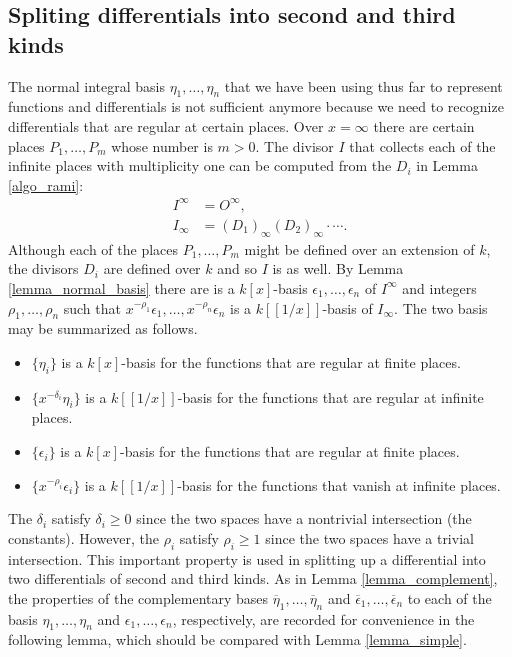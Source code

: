 \documentclass[12pt,reqno]{amsart}
\numberwithin{equation}{section}
\begin{document}
\subsection{Spliting differentials into second and third kinds}
\label{subsection_split23}
The normal integral basis $\eta_1,\dots,\eta_n$ that we have been using thus far to represent functions and differentials is not sufficient anymore because we need to recognize differentials that are regular at certain places. Over $x=\infty$ there are certain places $P_1,\dots,P_m$ whose number is $m>0$. The divisor $I$ that collects each of the infinite places with multiplicity one can be computed from the $D_i$ in Lemma \ref{algo_rami}:
\begin{align*}
 I^{\infty} &= O^{\infty}\text{,}\\
 I_{\infty} &= (D_1)_{\infty}(D_2)_{\infty} \cdot \cdots\text{.}
\end{align*}
Although each of the places $P_1,\dots,P_{m}$ might be defined over an extension of $k$, the divisors $D_i$ are defined over $k$ and so $I$ is as well. By Lemma \ref{lemma_normal_basis} there are is a $k[x]$-basis $\epsilon_1,\dots,\epsilon_n$ of $I^{\infty}$ and integers $\rho_1,\dots,\rho_n$ such that $x^{-\rho_1}\epsilon_1,\dots,x^{-\rho_n}\epsilon_n$ is a $k[[1/x]]$-basis of $I_{\infty}$. The two basis may be summarized as follows.
\begin{itemize}
 \item $\{\eta_i\}$ is a $k[x]$-basis for the functions that are regular at finite places.
 \item $\{x^{-\delta_i} \eta_i\}$ is a $k[[1/x]]$-basis for the functions that are regular at infinite places.
 \item $\{\epsilon_i\}$ is a $k[x]$-basis for the functions that are regular at finite places.
 \item $\{x^{-\rho_i} \epsilon_i\}$ is a $k[[1/x]]$-basis for the functions that vanish at infinite places.
\end{itemize}
The $\delta_i$ satisfy $\delta_i \ge 0$ since the two spaces have a nontrivial intersection (the constants). However, the $\rho_i$ satisfy $\rho_i \ge 1$ since the two spaces have a trivial intersection. This important property is used in splitting up a differential into two differentials of second and third kinds. As in Lemma \ref{lemma_complement}, the properties of the complementary bases $\overline{\eta}_1, \dots, \overline{\eta}_n$ and $\overline{\epsilon}_1,\dots,\overline{\epsilon}_n$ to each of the basis $\eta_1, \dots, \eta_n$ and $\epsilon_1,\dots,\epsilon_n$, respectively, are recorded for convenience in the following lemma, which should be compared with Lemma \ref{lemma_simple}.
\end{document}
